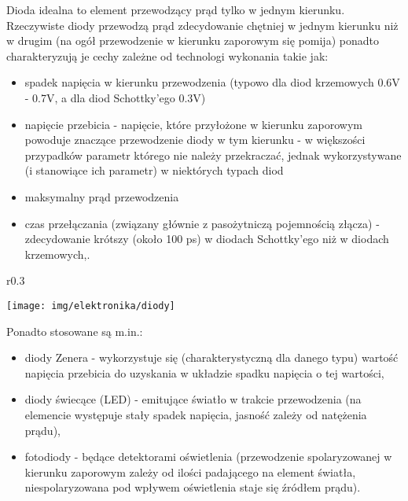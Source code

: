\documentclass{pdfBooklets}
\begin{document}
Dioda idealna to element przewodzący prąd tylko w jednym kierunku. Rzeczywiste diody przewodzą prąd zdecydowanie chętniej w jednym kierunku niż w drugim (na ogół przewodzenie w kierunku zaporowym się pomija) ponadto charakteryzują je cechy zależne od technologi wykonania takie jak:
\begin{itemize}
\item spadek napięcia w kierunku przewodzenia (typowo dla diod krzemowych 0.6V - 0.7V, a dla diod Schottky’ego 0.3V)
\item napięcie przebicia - napięcie, które przyłożone w kierunku zaporowym powoduje znaczące przewodzenie diody w tym kierunku - w większości przypadków parametr którego nie należy przekraczać, jednak wykorzystywane (i stanowiące ich parametr) w niektórych typach diod
\item maksymalny prąd przewodzenia
\item czas przełączania (związany głównie z pasożytniczą pojemnością złącza) - zdecydowanie krótszy (około 100 ps) w diodach Schottky’ego niż w diodach krzemowych,.
\end{itemize}

\begin{wrapfigure}{r}{0.3\textwidth}
  \begin{center}
    \texttt{[image: img/elektronika/diody]}
  \end{center}
\end{wrapfigure}

\noindent
Ponadto stosowane są m.in.:
\begin{itemize}
\item diody Zenera - wykorzystuje się (charakterystyczną dla danego typu) wartość napięcia przebicia do uzyskania w układzie spadku napięcia o tej wartości,
\item diody świecące (LED) - emitujące światło w trakcie przewodzenia (na elemencie występuje stały spadek napięcia, jasność zależy od natężenia prądu),
\item fotodiody - będące detektorami oświetlenia (przewodzenie spolaryzowanej w kierunku zaporowym zależy od ilości padającego na element światła, niespolaryzowana pod wpływem oświetlenia staje się źródłem prądu).
\end{itemize}
\end{document}
